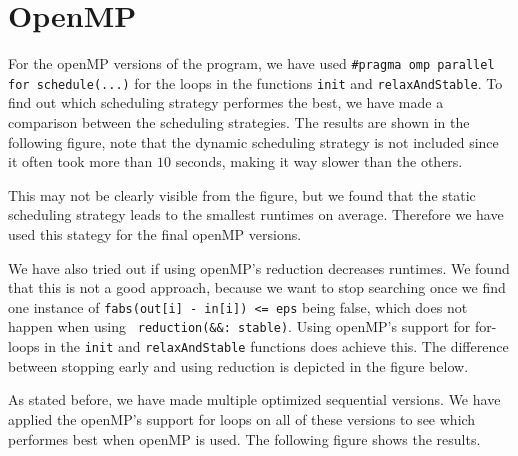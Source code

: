 \documentclass[a4paper]{article}
\begin{document}

\section{OpenMP}
For the openMP versions of the program, we have used \texttt{\#pragma omp parallel for schedule(...)} for the loops in the functions \texttt{init} and \texttt{relaxAndStable}. To find out which scheduling strategy performes the best, we have made a comparison between the scheduling strategies. The results are shown in the following figure, note that the dynamic scheduling strategy is not included since it often took more than $10$ seconds, making it way slower than the others.


This may not be clearly visible from the figure, but we found that the static scheduling strategy leads to the smallest runtimes on average. Therefore we have used this stategy for the final openMP versions.

We have also tried out if using openMP's reduction decreases runtimes. We found that this is not a good approach, because we want to stop searching once we find one instance of \texttt{fabs(out[i] - in[i]) <= eps} being false, which does not happen when using \texttt{ reduction(\&\&: stable)}. Using openMP's support for for-loops in the \texttt{init} and \texttt{relaxAndStable} functions does achieve this. The difference between stopping early and using reduction is depicted in the figure below.


As stated before, we have made multiple optimized sequential versions. We have applied the openMP's support for loops on all of these versions to see which performes best when openMP is used. The following figure shows the results.
\end{document}
